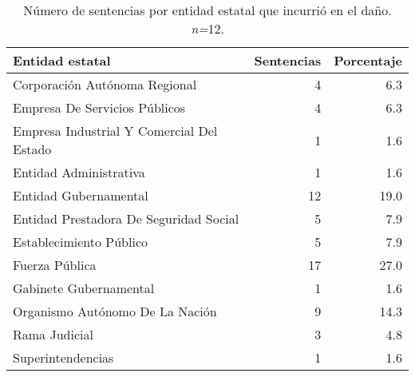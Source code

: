 \begin{table}[H]
\centering
\caption{Número de sentencias por entidad estatal que incurrió en el daño. \textit{n=}12.} 
\label{tab:entidad}
\begin{tabular}{lrr}
  \hline
Entidad estatal & Sentencias & Porcentaje \\ 
  \hline
Corporación Autónoma Regional &  4 & 6.3 \\ 
  Empresa De Servicios Públicos &  4 & 6.3 \\ 
  Empresa Industrial Y Comercial Del Estado &  1 & 1.6 \\ 
  Entidad Administrativa &  1 & 1.6 \\ 
  Entidad Gubernamental & 12 & 19.0 \\ 
  Entidad Prestadora De Seguridad Social &  5 & 7.9 \\ 
  Establecimiento Público &  5 & 7.9 \\ 
  Fuerza Pública & 17 & 27.0 \\ 
  Gabinete Gubernamental &  1 & 1.6 \\ 
  Organismo Autónomo De La Nación &  9 & 14.3 \\ 
  Rama Judicial &  3 & 4.8 \\ 
  Superintendencias &  1 & 1.6 \\ 
   \hline
\end{tabular}
\end{table}
